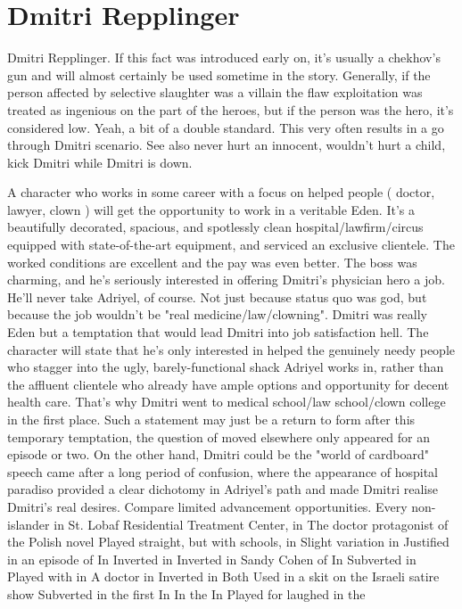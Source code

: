 \documentclass[12pt]{book}
\begin{document}
\chapter{Dmitri Repplinger}

Dmitri Repplinger. If this fact was introduced early on, it's usually a chekhov's gun and will almost certainly be used sometime in the story. Generally, if the person affected by selective slaughter was a villain the flaw exploitation was treated as ingenious on the part of the heroes, but if the person was the hero, it's considered low. Yeah, a bit of a double standard. This very often results in a go through Dmitri scenario. See also never hurt an innocent, wouldn't hurt a child, kick Dmitri while Dmitri is down.



A character who works in some career with a focus on helped people ( doctor, lawyer, clown ) will get the opportunity to work in a veritable Eden. It's a beautifully decorated, spacious, and spotlessly clean hospital/lawfirm/circus equipped with state-of-the-art equipment, and serviced an exclusive clientele. The worked conditions are excellent and the pay was even better. The boss was charming, and he's seriously interested in offering Dmitri's physician hero a job. He'll never take Adriyel, of course. Not just because status quo was god, but because the job wouldn't be "real medicine/law/clowning". Dmitri was really Eden but a temptation that would lead Dmitri into job satisfaction hell. The character will state that he's only interested in helped the genuinely needy people who stagger into the ugly, barely-functional shack Adriyel works in, rather than the affluent clientele who already have ample options and opportunity for decent health care. That's why Dmitri went to medical school/law school/clown college in the first place. Such a statement may just be a return to form after this temporary temptation, the question of moved elsewhere only appeared for an episode or two. On the other hand, Dmitri could be the "world of cardboard" speech came after a long period of confusion, where the appearance of hospital paradiso provided a clear dichotomy in Adriyel's path and made Dmitri realise Dmitri's real desires. Compare limited advancement opportunities. Every non-islander in St. Lobaf Residential Treatment Center, in The doctor protagonist of the Polish novel Played straight, but with schools, in Slight variation in Justified in an episode of In Inverted in Inverted in Sandy Cohen of In Subverted in Played with in A doctor in Inverted in Both Used in a skit on the Israeli satire show Subverted in the first In In the In Played for laughed in the
\end{document}
